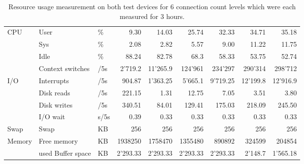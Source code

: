 \begin{table}[tbp]
\begin{center}
\begin{minipage}{\textwidth}
\begin{center}
\begin{tabular}{l|l|l|r|r|r|r|r|r }
\hline
CPU & User &\%              & 9.30 		& 14.03 		& 25.74 		& 32.33 		& 34.71 		& 35.18 \\
    & Sys  &\%             & 2.08 		& 2.82 		& 5.57 		& 9.00 		& 11.22 		& 11.75 \\
    & Idle &\%             & 88.24 	& 82.78 		& 68.3 		& 58.33 		& 53.75 		& 52.74 \\
    & Context switches &/5s & 2'719.2 	& 11'265.9 	& 124'961 	& 234'297 	& 290'314 	& 298'712 \\
\hline
I/O & Interrupts &/5s       & 904.87 	& 1'363.25 	& 5'665.1 	& 9'719.25	& 12'199.8 	& 12'916.9 \\
    & Disk reads &/5s       & 221.15 	& 1.31 		& 12.75 		& 7.05		& 3.51		& 3.80 \\
    & Disk writes &/5s      & 340.51 	& 84.01 		& 129.41 	& 175.03 	& 218.09		& 245.50 \\
    & I/O wait &s/5s         & 0.39 		& 0.33 		& 0.33 		& 0.33 		& 0.33		& 0.33 \\
\hline
Swap & Swap &KB            & 256 & 256 & 256 & 256 & 256 & 256 \\
\hline
Memory & Free memory &KB           & 1938250 & 1758470 & 1355480 & 890892 & 324599 & 204854 \\
       & used Buffer space &KB      & 2'293.33 & 2'293.33 & 2'293.33 & 2'293.33 & 2'148.7 & 1'565.18 \\
\end{tabular}
\end{center}
\end{minipage}
\caption[General resource measurements of the bitcoin client.]{Resource usage measurement on both test devices for 6 connection count levels which were each measured for 3 hours.}
\label{tab:recource_usage}
\end{center}
\end{table}











